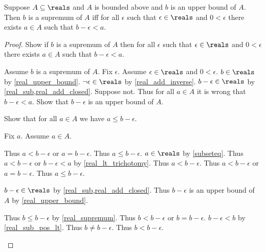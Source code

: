 \begin{theorem}\label{real_supremum_characterization}
    Suppose $A\subseteq\reals$ and $A$ is bounded above and $b$ is an upper bound of $A$.
    Then $b$ is a supremum of $A$ iff for all $\epsilon$ such that $\epsilon\in\reals$ and $0 < \epsilon$ there exists $a\in A$ such that $b - \epsilon < a$.
\end{theorem}
\begin{proof}
    Show if $b$ is a supremum of $A$ then for all $\epsilon$ such that $\epsilon\in\reals$ and $0 < \epsilon$ there exists $a\in A$ such that $b - \epsilon < a$.
    \begin{subproof}
        Assume $b$ is a supremum of $A$.
        Fix $\epsilon$.
        Assume $\epsilon\in\reals$ and $0 < \epsilon$.
        $b\in\reals$ by \cref{real_upper_bound}.
        $\neg{\epsilon}\in\reals$ by \cref{real_add_inverse}.
        $b - \epsilon\in\reals$ by \cref{real_sub,real_add_closed}.
        Suppose not.
        Thus for all $a\in A$ it is wrong that $b - \epsilon < a$.
        Show that $b - \epsilon$ is an upper bound of $A$.
        \begin{subproof}
            Show that for all $a\in A$ we have $a \leq b - \epsilon$.
            \begin{subproof}
                Fix $a$.
                Assume $a\in A$.
                \begin{byCase}
                    Thus $a < b - \epsilon$ or $a = b - \epsilon$.
                    Thus $a \leq b - \epsilon$.
                    $a\in\reals$ by \cref{subseteq}.
                    Thus $a < b - \epsilon$ or $b - \epsilon < a$ by \cref{real_lt_trichotomy}.
                    Thus $a < b - \epsilon$.
                    Thus $a < b - \epsilon$ or $a = b - \epsilon$.
                    Thus $a \leq b - \epsilon$.
                \end{byCase}
            \end{subproof}
            $b - \epsilon\in\reals$ by \cref{real_sub,real_add_closed}.
            Thus $b - \epsilon$ is an upper bound of $A$ by \cref{real_upper_bound}.
        \end{subproof}
        Thus $b \leq b - \epsilon$ by \cref{real_supremum}.
        Thus $b < b - \epsilon$ or $b = b - \epsilon$.
        $b - \epsilon < b$ by \cref{real_sub_pos_lt}.
        Thus $b \neq b - \epsilon$.
        Thus $b < b - \epsilon$.

\end{subproof}
\end{proof}
